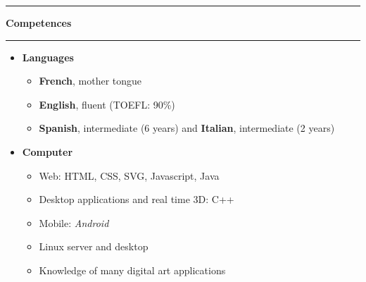 \documentclass[a4paper,11pt]{article} %
\newcommand{\trad}[2]{#1}
\newcommand{\titre}[1]{%
	\begin{center}
	\rule{\textwidth}{1pt}
	\par
	\vspace{0.1cm}
        \textbf{\large #1}
	\par\rule{\textwidth}{1pt}
	\end{center}
	}
\newenvironment{customitemize}[0]
  { \begin{itemize}
    \addtolength{\itemsep}{\trad{-0.2}{0}\baselineskip}
    \addtolength{\baselineskip}{\trad{-0.2}{0}\baselineskip} }
  { \end{itemize} }
\begin{document}
\titre{\trad{Competences}{Compétences}}

\begin{customitemize}
\item \textbf{\trad{Languages}{Langues}}
	\begin{itemize} 
	\trad{\item \textbf{French}, mother tongue}{}
	\item \trad{\textbf{English}, fluent (TOEFL: 90\%)} %
				{\textbf{Anglais}, autonome} %
	\item \trad{\textbf{Spanish}, intermediate (6 years) and \textbf{Italian}, intermediate (2 years)} %
				{\textbf{Espagnol}, niveau intermédiaire (6 années d'études) et \textbf{Italien}, niveau intermédiaire (2 années d'études)}
	\end{itemize}
\item \textbf{\trad{Computer}{Informatique}}
	\begin{itemize}
	\item \trad{Web: HTML, CSS, SVG, Javascript, Java}											{Programmation web : HTML, CSS, SVG, Javascript, Java}
	\item \trad{Desktop applications and real time 3D: C++}										{C++ (applications de bureau, 3D temps réel)}
	\item \trad{Mobile: \textit{Android}}									  					{Programmation mobile : \textit{Android}}
	\item \trad{Linux server and desktop}                                                       {Utilisation quotidienne d'environnements Linux et administration de serveurs Linux}
	\item \trad{Knowledge of many digital art applications}							            {Maîtrise de nombreux outils d'infographie professionnelle}
	\end{itemize}
\end{customitemize}
\end{document}

